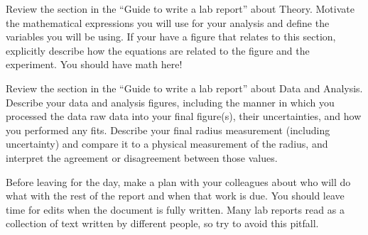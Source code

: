 \documentclass[11pt]{article}
\begin{document}

\vspace{3mm}

Review the section in the ``Guide to write a lab report'' about Theory. Motivate the mathematical expressions you will use for your analysis and define the variables you will be using. If your have a figure that relates to this section, explicitly describe how the equations are related to the figure and the experiment. You should have math here!

\vspace{5mm}


\vspace{3mm}

Review the section in the ``Guide to write a lab report'' about Data and Analysis. Describe your data and analysis figures, including the manner in which you processed the data raw data into your final figure(s), their uncertainties, and how you performed any fits.  Describe your final radius measurement (including uncertainty) and compare it to a physical measurement of the radius, and interpret the agreement or disagreement between those values. 


\vspace{5mm}


\vspace{3mm}

Before leaving for the day, make a plan with your colleagues about who will do what with the rest of the report and when that work is due. You should leave time for edits when the document is fully written. Many lab reports read as a collection of text written by different people, so try to avoid this pitfall.
\vspace{6mm}

\end{document}
